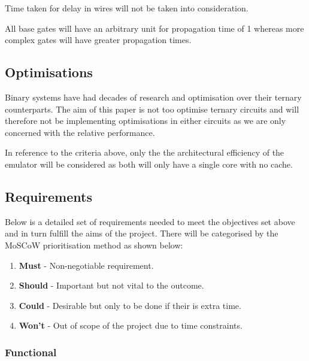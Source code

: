 \documentclass{article}
\begin{document}
Time taken for delay in wires will not be taken into consideration.

All base gates will have an arbitrary unit for propagation time of 1 whereas more complex gates will have greater
propagation times.

\subsection{Optimisations}

Binary systems have had decades of research and optimisation over their ternary counterparts. The aim of this paper is 
not too optimise ternary circuits and will therefore not be implementing optimisations in either circuits 
as we are only concerned with the relative performance.

In reference to the criteria above, only the the architectural efficiency of the emulator will be considered as both 
will only have a single core with no cache.

\subsection{Requirements}

Below is a detailed set of requirements needed to meet the objectives set above and in turn fulfill the aims of the 
project. There will be categorised by the MoSCoW prioritisation method as shown below:

\begin{enumerate}
  \item \textbf{Must} - Non-negotiable requirement.
  \item \textbf{Should} - Important but not vital to the outcome.
  \item \textbf{Could} - Desirable but only to be done if their is extra time.
  \item \textbf{Won't} - Out of scope of the project due to time constraints.
\end{enumerate}

\subsubsection{Functional}
\end{document}

